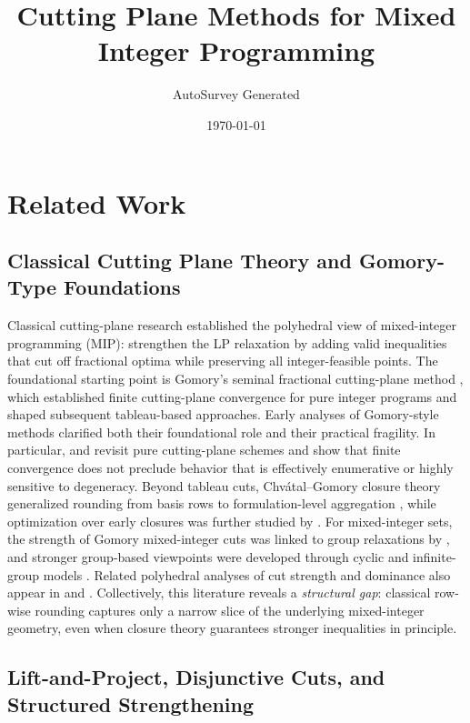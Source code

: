 \documentclass[11pt]{article}
\title{Cutting Plane Methods for Mixed Integer Programming}
\author{AutoSurvey Generated}
\date{\today}
\begin{document}
\maketitle

\section{Related Work}

\subsection{Classical Cutting Plane Theory and Gomory-Type Foundations}

Classical cutting-plane research established the polyhedral view of mixed-integer programming (MIP): strengthen the LP relaxation by adding valid inequalities that cut off fractional optima while preserving all integer-feasible points. The foundational starting point is Gomory's seminal fractional cutting-plane method \citep{Gomory_1958}, which established finite cutting-plane convergence for pure integer programs and shaped subsequent tableau-based approaches. Early analyses of Gomory-style methods clarified both their foundational role and their practical fragility. In particular, \citet{Balas_2010} and \citet{Zanette_2009} revisit pure cutting-plane schemes and show that finite convergence does not preclude behavior that is effectively enumerative or highly sensitive to degeneracy. Beyond tableau cuts, Chv\'atal--Gomory closure theory generalized rounding from basis rows to formulation-level aggregation \citep{Cook_1990, unknown2020generalized, Dash_2021, Caprara_1996, Bonami_2006}, while optimization over early closures was further studied by \citet{Fischetti_2006}. For mixed-integer sets, the strength of Gomory mixed-integer cuts was linked to group relaxations by \citet{Dash_2007}, and stronger group-based viewpoints were developed through cyclic and infinite-group models \citep{Fischetti_2006, Kianfar_2008}. Related polyhedral analyses of cut strength and dominance also appear in \citet{Skutella_2010} and \citet{Deza_1992}. Collectively, this literature reveals a \emph{structural gap}: classical row-wise rounding captures only a narrow slice of the underlying mixed-integer geometry, even when closure theory guarantees stronger inequalities in principle.

\subsection{Lift-and-Project, Disjunctive Cuts, and Structured Strengthening}
\end{document}
